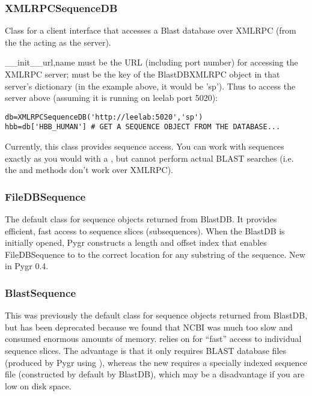 \documentclass{howto}
\begin{document}
\subsubsection{XMLRPCSequenceDB}
Class for a client interface that accesses a Blast database over
XMLRPC (from the the  acting as the server).
\begin{funcdesc}{__init__}{url,name}
   must be the URL (including port number) for accessing the 
  XMLRPC server;  must be the key of the BlastDBXMLRPC object
  in that server's dictionary (in the example above, it would be 'sp').
  Thus to access the server above (assuming it is running on leelab port 5020):
\begin{verbatim}
db=XMLRPCSequenceDB('http://leelab:5020','sp')
hbb=db['HBB_HUMAN'] # GET A SEQUENCE OBJECT FROM THE DATABASE...
\end{verbatim}
\end{funcdesc}
Currently, this class provides sequence access.  You can work with sequences
exactly as you would with a , but cannot perform actual BLAST searches
(i.e. the  and  methods don't work over XMLRPC).

\subsubsection{FileDBSequence}
The default class for sequence objects returned from BlastDB.  It provides efficient,
fast access to sequence slices (subsequences).  When the BlastDB is initially opened,
Pygr constructs a length and offset index that enables FileDBSequence to 
to the correct location for any substring of the sequence.  New in Pygr 0.4.

\subsubsection{BlastSequence}

This was previously the default class for sequence objects returned from BlastDB,
but has been deprecated because we found that NCBI  was much too slow
and consumed enormous amounts of memory.   relies on
 for ``fast'' access to individual sequence slices.  The advantage is
that it only requires BLAST database files (produced by Pygr using ),
whereas the new  requires a specially indexed sequence file
(constructed by default by BlastDB), which may be a disadvantage if you are low
on disk space.
\end{document}

